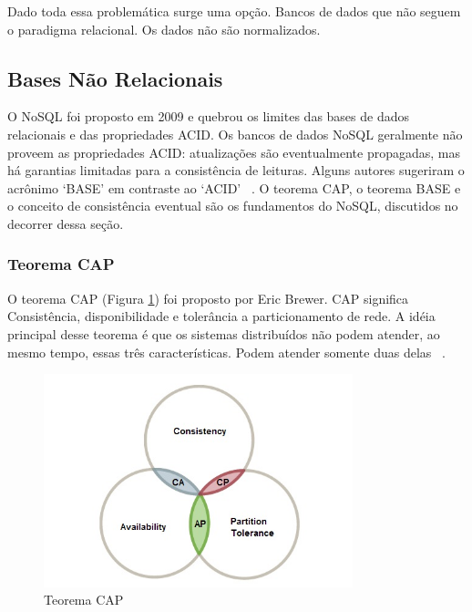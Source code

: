Dado toda essa problemática surge uma opção. Bancos de dados que não seguem o paradigma relacional. Os dados não são normalizados.

\subsection{Bases Não Relacionais}

O NoSQL foi proposto em 2009 e quebrou os limites das bases de dados relacionais e das propriedades ACID. Os bancos de dados NoSQL geralmente não proveem as propriedades ACID: atualizações são eventualmente propagadas, mas há garantias limitadas para a consistência de leituras. Alguns autores sugeriram  o acrônimo ‘BASE’ em contraste ao ‘ACID’ ~\cite{scalablesqlandnosql}. O teorema CAP, o teorema BASE e o conceito de consistência eventual são os fundamentos do NoSQL, discutidos no decorrer dessa seção.

\subsubsection{Teorema CAP}

O teorema CAP (Figura \ref{fig:captheorem}) foi proposto por Eric Brewer. CAP significa Consistência,  disponibilidade e tolerância a particionamento de rede.  A idéia principal desse teorema é que os sistemas distribuídos não podem atender, ao mesmo tempo, essas três características. Podem atender somente duas delas ~\cite{nosqlaplicassandra}.

	\begin{figure}[!htbp]
		\begin{center}
			\includegraphics[width=0.8\textwidth]{captheorem}
		\end{center}
		\caption{Teorema CAP ~\cite{capimage} }
		\label{fig:captheorem}
	\end{figure}

